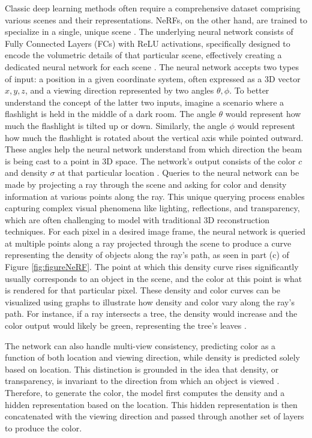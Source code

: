 Classic deep learning methods often require a comprehensive dataset comprising various scenes and their representations. NeRFs, on the other hand, are trained to specialize in a single, unique scene \citep{mildenhallNERF}. The underlying neural network consists of Fully Connected Layers (FCs) with ReLU activations, specifically designed to encode the volumetric details of that particular scene, effectively creating a dedicated neural network for each scene \citep{mildenhallNERF}. The neural network accepts two types of input: a position in a given coordinate system, often expressed as a 3D vector \(x, y, z\), and a viewing direction represented by two angles \( \theta, \phi \). To better understand the concept of the latter two inputs, imagine a scenario where a flashlight is held in the middle of a dark room. The angle \( \theta \) would represent how much the flashlight is tilted up or down. Similarly, the angle \( \phi \) would represent how much the flashlight is rotated about the vertical axis while pointed outward. These angles help the neural network understand from which direction the beam is being cast to a point in 3D space. The network's output consists of the color \(c\) and density \( \sigma \) at that particular location \citep{mildenhallNERF}. Queries to the neural network can be made by projecting a ray through the scene and asking for color and density information at various points along the ray. This unique querying process enables capturing complex visual phenomena like lighting, reflections, and transparency, which are often challenging to model with traditional 3D reconstruction techniques. For each pixel in a desired image frame, the neural network is queried at multiple points along a ray projected through the scene to produce a curve representing the density of objects along the ray's path, as seen in part (c) of Figure \ref{fig:figureNeRF}. The point at which this density curve rises significantly usually corresponds to an object in the scene, and the color at this point is what is rendered for that particular pixel. These density and color curves can be visualized using graphs to illustrate how density and color vary along the ray's path. For instance, if a ray intersects a tree, the density would increase and the color output would likely be green, representing the tree's leaves \citep{mildenhallNERF}.

The network can also handle multi-view consistency, predicting color as a function of both location and viewing direction, while density is predicted solely based on location. This distinction is grounded in the idea that density, or transparency, is invariant to the direction from which an object is viewed \citep{hu2023consistentnerf}. Therefore, to generate the color, the model first computes the density and a hidden representation based on the location. This hidden representation is then concatenated with the viewing direction and passed through another set of layers to produce the color.

